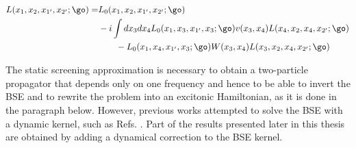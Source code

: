\begin{align}
\begin{split}
	L(x_1,x_2,x_{1'},x_{2'};\go) = &L_0(x_1,x_2,x_{1'},x_{2'};\go) \\
	    &-i \int dx_3dx_4 L_0(x_1,x_3,x_{1'},x_{3};\go) v(x_3,x_4) L(x_4,x_2,x_{4},x_{2'};\go) \\
		&\qquad - L_0(x_1,x_4,x_{1'},x_{3};\go) W(x_3,x_4)  L(x_3,x_2,x_{4},x_{2'};\go) \label{eq:GW-BSE}
\end{split}
\end{align}

The static screening approximation is necessary to obtain a two-particle propagator that depends only on one frequency and hence to be able to invert the \acrshort{BSE} and to rewrite the problem into an excitonic Hamiltonian, as it is done in the paragraph below. However, previous works attempted to solve the \acrshort{BSE} with a dynamic kernel, such as Refs. \cite{shindo1970effective,adamska2021bethe}. Part of the results presented later in this thesis are obtained by adding a dynamical correction to the \acrshort{BSE} kernel.

